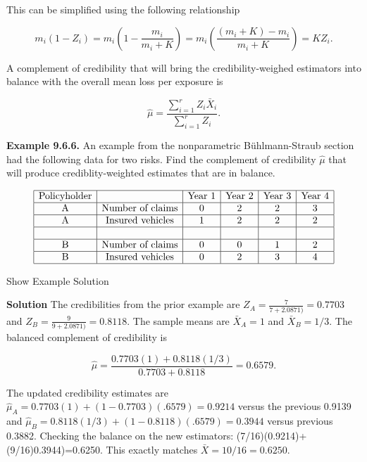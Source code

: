 \documentclass[]{book}
\theoremstyle{definition}
\theoremstyle{definition}
\theoremstyle{definition}
\theoremstyle{remark}
\begin{document}
This can be simplified using the following relationship

\begin{equation*}  
m_i(1-Z_i)=m_i\left(1-\frac{m_i}{m_i+K}\right)=m_i\left(\frac{(m_i+K)-m_i}{m_i+K}\right)=KZ_i .
\end{equation*}

A complement of credibility that will bring the credibility-weighed
estimators into balance with the overall mean loss per exposure is

\begin{equation*}  
\hat{\mu}=\frac{\sum_{i=1}^r  Z_i \bar{X}_i}{\sum_{i=1}^r  Z_i}. \end{equation*}

\textbf{Example 9.6.6.} An example from the nonparametric
Bühlmann-Straub section had the following data for two risks. Find the
complement of credibility \(\hat{\mu}\) that will produce
crediblity-weighted estimates that are in balance.

\[\begin{matrix}
\begin{array}{|c|c|c|c|c|c|}
\hline
\text{Policyholder} &  & \text{Year 1} & \text{Year 2} & \text{Year 3} & \text{Year 4} \\
\hline
\text{A} & \text{Number of claims} & 0 & 2 & 2 & 3 \\
\hline
\text{A} & \text{Insured vehicles} &  1 & 2 & 2 & 2\\  
\hline
 & & & & & \\
\hline
\text{B} & \text{Number of claims} & 0 & 0 & 1 & 2\\    
\hline 
\text{B} & \text{Insured vehicles} &  0 & 2 & 3 & 4\\      
\hline
\end{array}
\end{matrix}\]

Show Example Solution

\hypertarget{toggleExampleCred.6.6}{}
\textbf{Solution} The credibilities from the prior example are
\(Z_A=\frac{7}{7+2.0871)}=0.7703\) and
\(Z_B=\frac{9}{9+2.0871)}=0.8118\). The sample means are \(\bar{X}_A=1\)
and \(\bar{X}_B=1/3\). The balanced complement of credibility is

\begin{equation*}  
\hat{\mu}=\frac{0.7703(1)+0.8118(1/3)}{0.7703+0.8118}=0.6579.
\end{equation*}

The updated credibility estimates are
\(\hat{\mu}_A=0.7703(1)+(1-0.7703)(.6579)=0.9214\) versus the previous
0.9139 and \(\hat{\mu}_B=0.8118(1/3)+(1-0.8118)(.6579)=0.3944\) versus
previous 0.3882. Checking the balance on the new estimators:
(7/16)(0.9214)+(9/16)0.3944)=0.6250. This exactly matches
\(\bar{X}=10/16=0.6250\).
\end{document}
